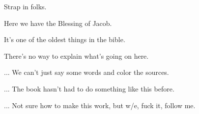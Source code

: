 
{
}
{
}
{
	Strap in folks.

	Here we have the Blessing of Jacob.

	It's one of the oldest things in the bible.

	There's no way to explain what's going on here.

	... We can't just say some words and color the sources.

	... The book hasn't had to do something like this before.

	... Not sure how to make this work, but w/e, fuck it, follow me.
}

